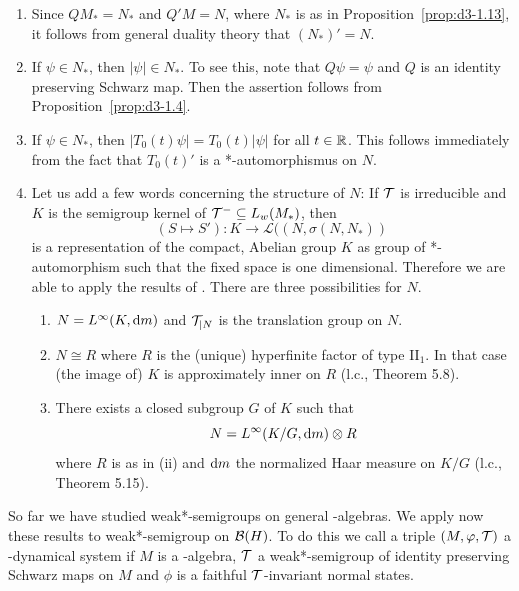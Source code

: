 \begin{remarks}\label{rem:d4-3.6}
\begin{enumerate}[\upshape (i), wide, labelindent=.25em]
\item
Since $QM_{*} = N_{*}$ and $Q'M = N$, where $N_{*}$ is as in Proposition~\ref{prop:d3-1.13}, it follows from general duality theory that $(N_{*})' = N$.

\item
If\/ $\psi \in N_{*}$, then $|\psi| \in N_{*}$.
To see this, note that $Q\psi = \psi$ and $Q$ is an identity preserving Schwarz map.
Then the assertion follows from Proposition~\ref{prop:d3-1.4}.

\item
If\/ $\psi \in N_{*}$, then $|T_{0}(t)\psi| = T_{0}(t)|\psi|$ for all $t \in \mathbb{R}$.
This follows immediately from the fact that $T_{0}(t)'$ is a *-automorphismus on $N$.

\item
Let us add a few words concerning the structure of\/ $N$: If\/ $\mathcal{T}$ is irreducible and $K$ is the semigroup kernel of\/ $\mathcal{T}^{-} \subseteq L_{w}(M_{*})$, then 
%
\[
	(S \mapsto S'): K \to \mathcal{L}( (N,\sigma(N,N_{*}) ) 
\]
%
is a representation of the compact, Abelian group $K$ as group of *-automorphism such that the fixed space is one dimensional.
Therefore we are able to apply the results of \textcite{olesen:1980}.
There are three possibilities for $N$.
\begin{enumerate}[\upshape(i), wide, labelindent=.25em]
\item
$N = L^{\infty}(K,\mathop{}\!\mathrm{d}{m})$ and $\mathcal{T}_{\vert N}$ is the translation group on $N$.

\item
$N \cong R$ where $R$ is the (unique) hyperfinite factor of type II$_{1}$.
In that case (the image of) $K$ is approximately inner on $R$ (l.c., Theorem 5.8).

\item
There exists a closed subgroup $ G $  of\/ $ K $  such that
\[
N = L^{\infty}(K/G, \mathop{}\!\mathrm{d}{m}) \otimes R
\]
where $ R $  is as in (ii) and $ \mathop{}\!\mathrm{d}{m} $  the normalized Haar measure on $ K/G $  (l.c., Theorem 5.15).
\end{enumerate}
\end{enumerate}
\end{remarks}
So far we have studied weak*-semigroups on general \WA-algebras.
We apply now these results to weak*-semigroup on $ \mathcal{B}(H) $.
To do this we call a triple $ (M,\phi,\TT) $  a \WA-dynamical system if\/ $ M $  is a \WA-algebra, $ \mathcal{T}$ a weak*-semigroup of identity preserving Schwarz maps on $ M $  and $ \phi $  is a faithful \/ $ \mathcal{T} $-invariant normal states.
